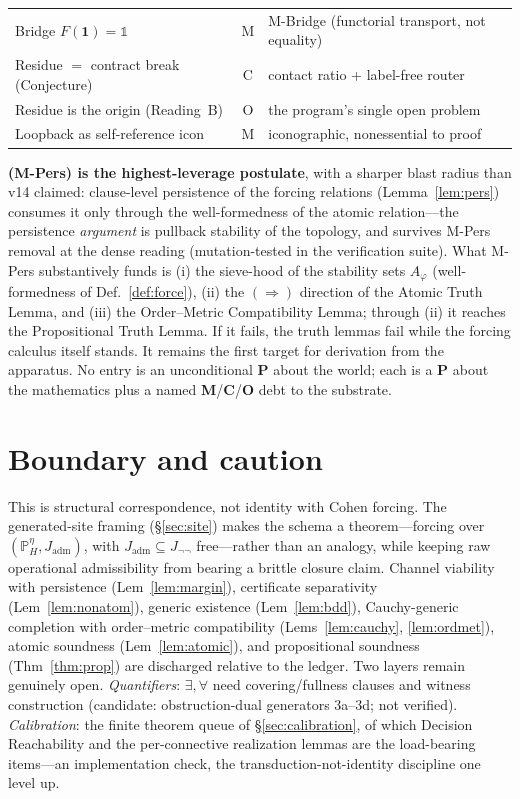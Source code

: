 \documentclass[11pt]{article}
\theoremstyle{definition}
\theoremstyle{remark}
\newcommand{\PHeta}{\mathbb{P}_{H}^{\eta}}
\newcommand{\Jadm}{J_{\mathrm{adm}}}
\newcommand{\Jnn}{J_{\neg\neg}}
\begin{document}
\begin{center}
\begin{tabular}{@{}p{} c p{}@{}}
Bridge $F(\mathbf{1})=\mathbb{1}$ & M & M-Bridge (functorial transport, not equality)\\
Residue $=$ contract break (Conjecture) & C & contact ratio + label-free router\\
Residue is the origin (Reading~B) & O & the program's single open problem\\
Loopback as self-reference icon & M & iconographic, nonessential to proof\\
\bottomrule
\end{tabular}
\end{center}

\noindent \textbf{(M-Pers) is the highest-leverage postulate}, with a sharper blast radius than v14
claimed: clause-level persistence of the forcing relations (Lemma~\ref{lem:pers}) consumes it only
through the well-formedness of the atomic relation---the persistence \emph{argument} is pullback
stability of the topology, and survives M-Pers removal at the dense reading (mutation-tested in
the verification suite). What M-Pers substantively funds is (i) the sieve-hood of the stability sets
$A_\varphi$ (well-formedness of Def.~\ref{def:force}), (ii) the $(\Rightarrow)$ direction of the
Atomic Truth Lemma, and (iii) the Order--Metric Compatibility Lemma; through (ii) it reaches the
Propositional Truth Lemma. If it fails, the truth lemmas fail while the forcing calculus itself
stands. It remains the first target for derivation from the apparatus. No entry is an unconditional
\textbf{P} about the world; each is a \textbf{P} about the mathematics plus a named
\textbf{M}/\textbf{C}/\textbf{O} debt to the substrate.

\section{Boundary and caution}

This is structural correspondence, not identity with Cohen forcing. The generated-site framing
(\S\ref{sec:site}) makes the schema a theorem---forcing over $(\PHeta,\Jadm)$, with $\Jadm\subseteq\Jnn$
free---rather than an analogy, while keeping raw operational admissibility from bearing a brittle
closure claim. Channel viability with persistence (Lem~\ref{lem:margin}), certificate separativity
(Lem~\ref{lem:nonatom}), generic existence (Lem~\ref{lem:bdd}), Cauchy-generic completion with
order--metric compatibility (Lems~\ref{lem:cauchy}, \ref{lem:ordmet}), atomic soundness
(Lem~\ref{lem:atomic}), and propositional soundness (Thm~\ref{thm:prop}) are discharged relative to the
ledger. Two layers remain genuinely open. \emph{Quantifiers}: $\exists,\forall$ need covering/fullness
clauses and witness construction (candidate: obstruction-dual generators 3a--3d; not verified).
\emph{Calibration}: the finite theorem queue of \S\ref{sec:calibration}, of which Decision
Reachability and the per-connective realization lemmas are the load-bearing items---an implementation
check, the transduction-not-identity discipline one level up.
\end{document}
